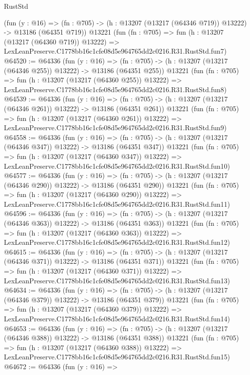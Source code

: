 \begin{lexlean}{RustStd}
\begin{coremodule}
    (fun (y : @16) =>
    (fn : @705) -> (h : @13207 (@13217 (@64346 @719)) @13222) -> @13186 (@64351 @719))
    @13221
    (fun (fn : @705) =>
    fun (h : @13207 (@13217 (@64360 @719)) @13222) =>
    LexLeanPreserve.C1778bb16c1cfe08d5e964765dd2c0216.R31.RustStd.fun7)
@64520 := @64336
    (fun (y : @16) =>
    (fn : @705) -> (h : @13207 (@13217 (@64346 @255)) @13222) -> @13186 (@64351 @255))
    @13221
    (fun (fn : @705) =>
    fun (h : @13207 (@13217 (@64360 @255)) @13222) =>
    LexLeanPreserve.C1778bb16c1cfe08d5e964765dd2c0216.R31.RustStd.fun8)
@64539 := @64336
    (fun (y : @16) =>
    (fn : @705) -> (h : @13207 (@13217 (@64346 @261)) @13222) -> @13186 (@64351 @261))
    @13221
    (fun (fn : @705) =>
    fun (h : @13207 (@13217 (@64360 @261)) @13222) =>
    LexLeanPreserve.C1778bb16c1cfe08d5e964765dd2c0216.R31.RustStd.fun9)
@64558 := @64336
    (fun (y : @16) =>
    (fn : @705) -> (h : @13207 (@13217 (@64346 @347)) @13222) -> @13186 (@64351 @347))
    @13221
    (fun (fn : @705) =>
    fun (h : @13207 (@13217 (@64360 @347)) @13222) =>
    LexLeanPreserve.C1778bb16c1cfe08d5e964765dd2c0216.R31.RustStd.fun10)
@64577 := @64336
    (fun (y : @16) =>
    (fn : @705) -> (h : @13207 (@13217 (@64346 @290)) @13222) -> @13186 (@64351 @290))
    @13221
    (fun (fn : @705) =>
    fun (h : @13207 (@13217 (@64360 @290)) @13222) =>
    LexLeanPreserve.C1778bb16c1cfe08d5e964765dd2c0216.R31.RustStd.fun11)
@64596 := @64336
    (fun (y : @16) =>
    (fn : @705) -> (h : @13207 (@13217 (@64346 @363)) @13222) -> @13186 (@64351 @363))
    @13221
    (fun (fn : @705) =>
    fun (h : @13207 (@13217 (@64360 @363)) @13222) =>
    LexLeanPreserve.C1778bb16c1cfe08d5e964765dd2c0216.R31.RustStd.fun12)
@64615 := @64336
    (fun (y : @16) =>
    (fn : @705) -> (h : @13207 (@13217 (@64346 @371)) @13222) -> @13186 (@64351 @371))
    @13221
    (fun (fn : @705) =>
    fun (h : @13207 (@13217 (@64360 @371)) @13222) =>
    LexLeanPreserve.C1778bb16c1cfe08d5e964765dd2c0216.R31.RustStd.fun13)
@64634 := @64336
    (fun (y : @16) =>
    (fn : @705) -> (h : @13207 (@13217 (@64346 @379)) @13222) -> @13186 (@64351 @379))
    @13221
    (fun (fn : @705) =>
    fun (h : @13207 (@13217 (@64360 @379)) @13222) =>
    LexLeanPreserve.C1778bb16c1cfe08d5e964765dd2c0216.R31.RustStd.fun14)
@64653 := @64336
    (fun (y : @16) =>
    (fn : @705) -> (h : @13207 (@13217 (@64346 @388)) @13222) -> @13186 (@64351 @388))
    @13221
    (fun (fn : @705) =>
    fun (h : @13207 (@13217 (@64360 @388)) @13222) =>
    LexLeanPreserve.C1778bb16c1cfe08d5e964765dd2c0216.R31.RustStd.fun15)
@64672 := @64336
    (fun (y : @16) =>

\end{coremodule}
\end{lexlean}
